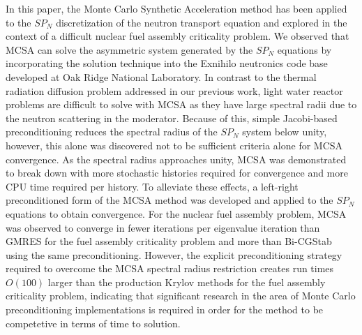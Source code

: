 \documentclass[letterpaper,12pt]{article}
\begin{document}
In this paper, the Monte Carlo Synthetic Acceleration method has been
applied to the $SP_N$ discretization of the neutron transport equation
and explored in the context of a difficult nuclear fuel assembly
criticality problem. We observed that MCSA can solve the asymmetric
system generated by the $SP_N$ equations by incorporating the solution
technique into the Exnihilo neutronics code base developed at Oak
Ridge National Laboratory. In contrast to the thermal radiation
diffusion problem addressed in our previous work, light water reactor
problems are difficult to solve with MCSA as they have large spectral
radii due to the neutron scattering in the moderator. Because of this,
simple Jacobi-based preconditioning reduces the spectral radius of the
$SP_N$ system below unity, however, this alone was discovered not to
be sufficient criteria alone for MCSA convergence. As the spectral
radius approaches unity, MCSA was demonstrated to break down with more
stochastic histories required for convergence and more CPU time
required per history. To alleviate these effects, a left-right
preconditioned form of the MCSA method was developed and applied to
the $SP_N$ equations to obtain convergence. For the nuclear fuel
assembly problem, MCSA was observed to converge in fewer iterations
per eigenvalue iteration than GMRES for the fuel assembly criticality
problem and more than Bi-CGStab using the same
preconditioning. However, the explicit preconditioning strategy
required to overcome the MCSA spectral radius restriction creates run
times $O(100)$ larger than the production Krylov methods for the fuel
assembly criticality problem, indicating that significant research in
the area of Monte Carlo preconditioning implementations is required in
order for the method to be competetive in terms of time to solution.

\pagebreak
 

\end{document}
